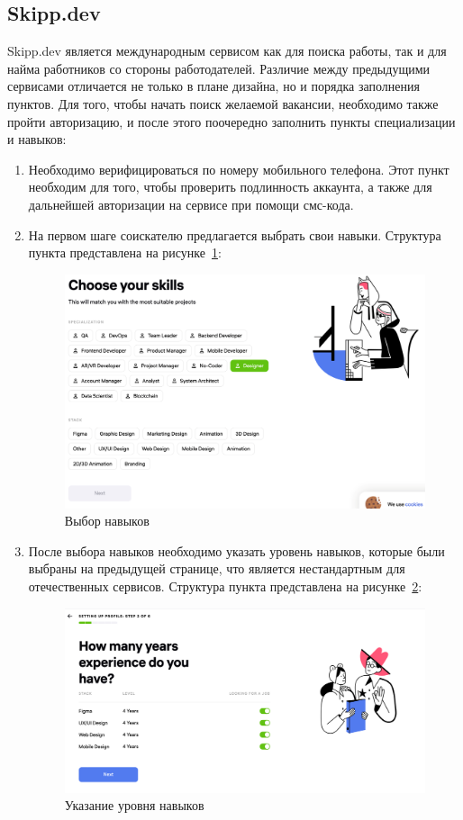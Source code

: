 \documentclass[master, och, pract]{SCWorks}
\begin{document}
\subsection{Skipp.dev}
Skipp.dev является международным сервисом как для поиска работы, так и для найма 
работников со стороны работодателей. Различие между предыдущими сервисами отличается 
не только в плане дизайна, но и порядка заполнения пунктов. Для того, чтобы начать 
поиск желаемой вакансии, необходимо также пройти авторизацию, и после этого 
поочередно заполнить пункты специализации и навыков:
\begin{enumerate}
    \item Необходимо верифицироваться по номеру мобильного телефона. 
    Этот пункт необходим для того, чтобы проверить подлинность аккаунта, 
    а также для дальнейшей авторизации на сервисе при помощи смс-кода.
    \item На первом шаге соискателю предлагается выбрать свои навыки. Структура 
    пункта представлена на рисунке~\ref{fig:10}:
        \begin{figure}[!ht]
            \centering
            \includegraphics[width=12cm]{images/image10.png}
            \caption{\label{fig:10}%
                Выбор навыков}
        \end{figure}

    \item После выбора навыков необходимо указать уровень навыков, 
    которые были выбраны на предыдущей странице, что является нестандартным 
    для отечественных сервисов. Структура пункта представлена на рисунке~\ref{fig:11}:
    \begin{figure}[!ht]
        \centering
        \includegraphics[width=12cm]{images/image11.png}
        \caption{\label{fig:11}%
            Указание уровня навыков}
    \end{figure}


\end{enumerate}
\end{document}
